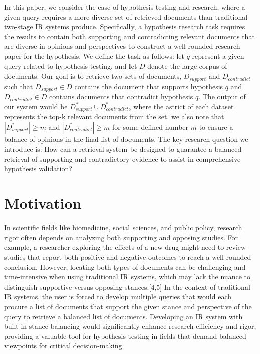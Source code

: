 \documentclass[sigconf]{acmart}
\begin{document}
  In this paper, we consider the case of hypothesis testing and research, where a given query requires a more diverse set of retrieved documents than traditional two-stage IR systems produce. Specifically, a hypothesis research task requires the results to contain both supporting and contradicting relevant documents that are diverse in opinions and perspectives to construct a well-rounded research paper for the hypothesis. We define the task as follows: let $q$ represent a given query related to hypothesis testing, and let $D$ denote the large corpus of documents. Our goal is to retrieve two sets of documents, $D_{support}$ and $D_{contradict}$ such that $D_{support}\in D$ contains the document that supports hypothesis $q$ and $D_{contradict}\in D$ contains documents that contradict hypothesis $q$. The output of our system would be $D_{support}^*\cup D_{contradict}^*$, where the astrict of each dataset represents the top-k relevant documents from the set. we also note that $|D_{support}^*|\geq m$ and $|D_{contradict}^*|\geq m$ for some defined number $m$ to ensure a balance of opinions in the final list of documents. The key research question we introduce is: How can a retrieval system be designed to guarantee a balanced retrieval of supporting and contradictory evidence to assist in comprehensive hypothesis validation?

\section{Motivation}
In scientific fields like biomedicine, social sciences, and public policy, research rigor often depends on analyzing both supporting and opposing studies. For example, a researcher exploring the effects of a new drug might need to review studies that report both positive and negative outcomes to reach a well-rounded conclusion. However, locating both types of documents can be challenging and time-intensive when using traditional IR systems, which may lack the nuance to distinguish supportive versus opposing stances.[4,5] In the context of traditional IR systems, the user is forced to develop multiple queries that would each procure a list of documents that support the given stance and perspective of the query to retrieve a balanced list of documents. Developing an IR system with built-in stance balancing would significantly enhance research efficiency and rigor, providing a valuable tool for hypothesis testing in fields that demand balanced viewpoints for critical decision-making.
\end{document}
